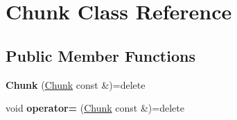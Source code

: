 \hypertarget{classChunk}{\section{Chunk Class Reference}
\label{classChunk}
}
\subsection*{Public Member Functions}
\begin{DoxyCompactItemize}
\item 
\hypertarget{classChunk_a698770d828a0a5b98250ce52a8576f4c}{{\bfseries Chunk} (\hyperlink{classChunk}{Chunk} const \&)=delete}\label{classChunk_a698770d828a0a5b98250ce52a8576f4c}

\item 
\hypertarget{classChunk_a739049c7e4b9e6b8d501ff9959e73cee}{void {\bfseries operator=} (\hyperlink{classChunk}{Chunk} const \&)=delete}\label{classChunk_a739049c7e4b9e6b8d501ff9959e73cee}


\end{DoxyCompactItemize}
